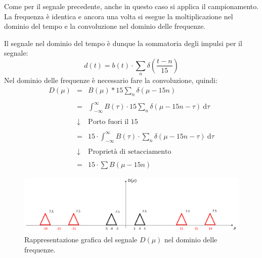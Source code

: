 \documentclass[a4paper]{article}
\begin{document}
	Come per il segnale precedente, anche in questo caso si applica il campionamento. La frequenza è identica e ancora una volta si esegue la moltiplicazione nel dominio del tempo e la convoluzione nel dominio delle frequenze.\newline
	
	\noindent
	Il segnale nel dominio del tempo è dunque la sommatoria degli impulsi per il segnale:
	\begin{equation*}
		d\left(t\right) = b\left(t\right) \cdot \displaystyle\sum_{n} \delta\left(\dfrac{t-n}{15}\right)
	\end{equation*}
	Nel dominio delle frequenze è necessario fare la convoluzione, quindi:
	\begin{equation*}
		\begin{array}{lll}
			D\left(\mu\right) & = & B\left(\mu\right) * 15\displaystyle\sum_{n} \delta\left(\mu - 15n\right) \\
			\\
			& = & \displaystyle\int_{-\infty}^{\infty} B\left(\tau\right) \cdot 15\displaystyle\sum_{n} \delta\left(\mu - 15n - \tau\right) \: \mathrm{d}\tau \\
			\\
			& \downarrow & \text{Porto fuori il } 15 \\
			\\
			& = & 15 \cdot \displaystyle\int_{-\infty}^{\infty} B\left(\tau\right) \cdot \displaystyle\sum_{n} \delta\left(\mu - 15n - \tau\right) \: \mathrm{d}\tau \\
			\\
			& \downarrow & \text{Proprietà di setacciamento} \\
			\\
			& = & 15 \cdot \displaystyle\sum B\left(\mu - 15n\right)
		\end{array}
	\end{equation*}
	\begin{figure}[!htp]
		\centering
		\includegraphics[width=\textwidth]{img/fig_4.png}
		\caption*{Rappresentazione grafica del segnale $D\left(\mu\right)$ nel dominio delle frequenze.}
	\end{figure}\newpage
\end{document}
